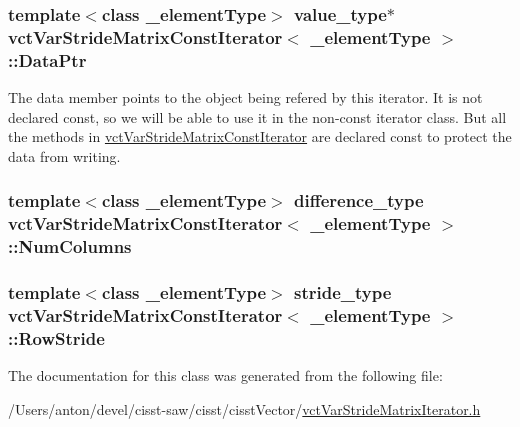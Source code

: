 \subsubsection[{Data\+Ptr}]{\setlength{\rightskip}{0pt plus 5cm}template$<$class \+\_\+element\+Type$>$ value\+\_\+type$\ast$ {\bf vct\+Var\+Stride\+Matrix\+Const\+Iterator}$<$ \+\_\+element\+Type $>$\+::Data\+Ptr\hspace{0.3cm}{\ttfamily [protected]}}\label{classvct_var_stride_matrix_const_iterator_a37082ec0e45ee9d5be0b904b5bc81bb2}
The data member points to the object being refered by this iterator. It is not declared const, so we will be able to use it in the non-\/const iterator class. But all the methods in \hyperlink{classvct_var_stride_matrix_const_iterator}{vct\+Var\+Stride\+Matrix\+Const\+Iterator} are declared const to protect the data from writing. \hypertarget{classvct_var_stride_matrix_const_iterator_acbbccea49ba03c2c413bffe4bb5bfa7f}{}
\subsubsection[{Num\+Columns}]{\setlength{\rightskip}{0pt plus 5cm}template$<$class \+\_\+element\+Type$>$ difference\+\_\+type {\bf vct\+Var\+Stride\+Matrix\+Const\+Iterator}$<$ \+\_\+element\+Type $>$\+::Num\+Columns\hspace{0.3cm}{\ttfamily [protected]}}\label{classvct_var_stride_matrix_const_iterator_acbbccea49ba03c2c413bffe4bb5bfa7f}
\hypertarget{classvct_var_stride_matrix_const_iterator_a404ec3349c14282af252a00d3b9a6290}{}
\subsubsection[{Row\+Stride}]{\setlength{\rightskip}{0pt plus 5cm}template$<$class \+\_\+element\+Type$>$ stride\+\_\+type {\bf vct\+Var\+Stride\+Matrix\+Const\+Iterator}$<$ \+\_\+element\+Type $>$\+::Row\+Stride\hspace{0.3cm}{\ttfamily [protected]}}\label{classvct_var_stride_matrix_const_iterator_a404ec3349c14282af252a00d3b9a6290}


The documentation for this class was generated from the following file\+:\begin{DoxyCompactItemize}
\item 
/\+Users/anton/devel/cisst-\/saw/cisst/cisst\+Vector/\hyperlink{vct_var_stride_matrix_iterator_8h}{vct\+Var\+Stride\+Matrix\+Iterator.\+h}\end{DoxyCompactItemize}
